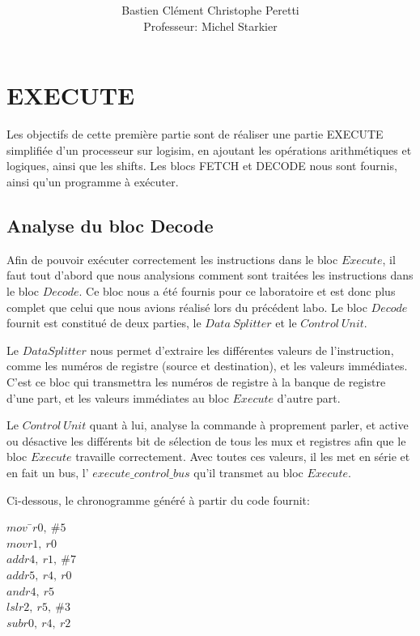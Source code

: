\documentclass[11pt,a4paper]{article}
\author{Bastien Clément Christophe Peretti \\
  Professeur: Michel Starkier}
\title{{\normalsize \doccourse} \\ \doctitle }
\begin{document}
\maketitle
\vspace{1em}

\section{EXECUTE}

Les objectifs de cette première partie sont de réaliser une partie EXECUTE simplifiée d'un processeur sur logisim, en ajoutant les opérations arithmétiques et logiques, ainsi que les shifts. Les blocs FETCH et DECODE nous sont fournis, ainsi qu'un programme à exécuter.

\subsection{Analyse du bloc Decode}

Afin de pouvoir exécuter correctement les instructions dans le bloc $Execute$, il faut tout d'abord que nous analysions comment sont traitées les instructions dans le bloc $Decode$. Ce bloc nous a été fournis pour ce laboratoire et est donc plus complet que celui que nous avions réalisé lors du précédent labo. Le bloc $Decode$ fournit est constitué de deux parties, le $Data\ Splitter$ et le $Control\ Unit$.

Le $Data Splitter$ nous permet d'extraire les différentes valeurs de l'instruction, comme les numéros de registre (source et destination), et les valeurs immédiates. C'est ce bloc qui transmettra les numéros de registre à la banque de registre d'une part, et les valeurs immédiates au bloc $Execute$ d'autre part.

Le $Control\ Unit$ quant à lui, analyse la commande à proprement parler, et active ou désactive les différents bit de sélection de tous les mux et registres afin que le bloc $Execute$ travaille correctement. Avec toutes ces valeurs, il les met en série et en fait un bus, l' $execute\_control\_bus$ qu'il transmet au bloc $Execute$.

Ci-dessous, le chronogramme généré à partir du code fournit:
\begin{tabbing}
$mov\ \ $\=$ r0,\ \#5$ \\
$mov$\>$r1,\ r0$ \\
$add$\>$r4,\ r1,\ \#7$ \\
$add$\>$r5,\ r4,\ r0$ \\
$and$\>$r4,\ r5$ \\
$lsl$\>$r2,\ r5,\ \#3$ \\
$sub$\>$r0,\ r4,\ r2$ \\
\end{tabbing}
\end{document}
